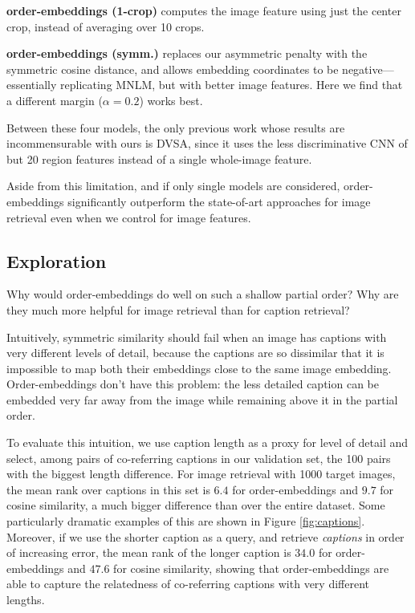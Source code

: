 \documentclass{article} \usepackage{iclr2016_conference,times}
\begin{document}
\textbf{order-embeddings (1-crop)} computes the image feature using just the center crop, instead of averaging over 10 crops.

\textbf{order-embeddings (symm.)} replaces our asymmetric penalty with the symmetric cosine distance, and allows embedding coordinates to be negative---essentially replicating MNLM, but with better image features. Here we find that a different margin ($\alpha = 0.2$) works best.

Between these four models, the only previous work whose results are incommensurable with ours is DVSA, since it uses the less discriminative CNN of \citet{alexnet} but 20 region features instead of a single whole-image feature.

Aside from this limitation, and if only single models are considered, order-embeddings significantly outperform the state-of-art approaches for image retrieval even when we control for image features. 


\subsection{Exploration}
Why would order-embeddings do well on such a shallow partial order? Why are they much more helpful for image retrieval than for caption retrieval? 

Intuitively, symmetric similarity should fail when an image has captions with very different levels of detail, because the captions are so dissimilar that it is impossible to map both their embeddings close to the same image embedding. Order-embeddings don't have this problem: the less detailed caption can be embedded very far away from the image while remaining above it in the partial order.

To evaluate this intuition, we use caption length as a proxy for level of detail and select,  among pairs of co-referring captions in our validation set, the 100 pairs with the biggest length difference. For image retrieval with 1000 target images, the mean rank over captions in this set is $6.4$ for order-embeddings and $9.7$ for cosine similarity, a much bigger difference than over the entire dataset.  Some particularly dramatic examples of this are shown in Figure \ref{fig:captions}. Moreover, if we use the shorter caption as a query, and retrieve \emph{captions} in order of increasing error, the mean rank of the longer caption is $34.0$ for order-embeddings and $47.6$ for cosine similarity, showing that order-embeddings are able to capture the relatedness of co-referring captions with very different lengths.
\end{document}
